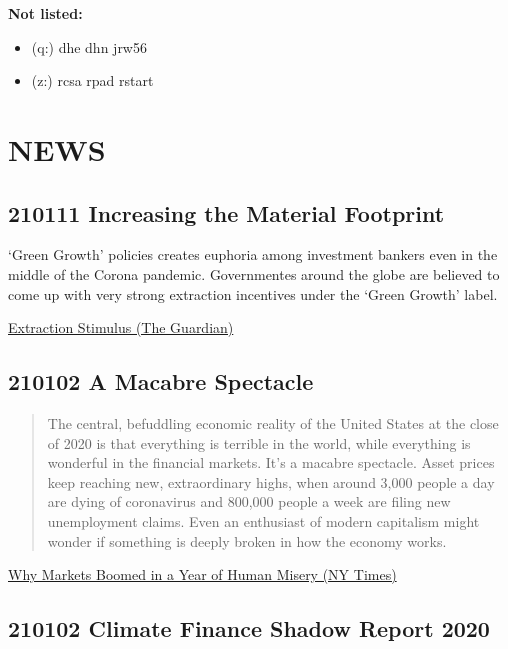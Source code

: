\documentclass[
]{book}
\providecommand{\tightlist}{%
  \setlength{\itemsep}{0pt}\setlength{\parskip}{0pt}}
\begin{document}
\textbf{Not listed:}

\begin{itemize}
\tightlist
\item
  (q:) dhe dhn jrw56
\item
  (z:) rcsa rpad rstart
\end{itemize}

\hypertarget{news}{%
\chapter{NEWS}\label{news}}

\hypertarget{increasing-the-material-footprint}{%
\section{210111 Increasing the Material Footprint}\label{increasing-the-material-footprint}}

`Green Growth' policies creates euphoria among investment bankers
even in the middle of the Corona pandemic.
Governmentes around the globe are believed to come up with very
strong extraction incentives under the `Green Growth' label.

\href{https://www.theguardian.com/business/2021/jan/10/green-economy-plans-fuel-new-metals-and-energy-supercycle}{Extraction Stimulus (The Guardian)}

\hypertarget{a-macabre-spectacle}{%
\section{210102 A Macabre Spectacle}\label{a-macabre-spectacle}}

\begin{quote}
The central, befuddling economic reality of the United States at the close of 2020 is that everything is terrible in the world, while everything is wonderful in the financial markets.
It's a macabre spectacle. Asset prices keep reaching new, extraordinary highs, when around 3,000 people a day are dying of coronavirus and 800,000 people a week are filing new unemployment claims. Even an enthusiast of modern capitalism might wonder if something is deeply broken in how the economy works.
\end{quote}

\href{https://www.nytimes.com/2021/01/01/upshot/why-markets-boomed-2020.html}{Why Markets Boomed in a Year of Human Misery (NY Times)}

\hypertarget{climate-finance-shadow-report-2020}{%
\section{210102 Climate Finance Shadow Report 2020}\label{climate-finance-shadow-report-2020}}
\end{document}
